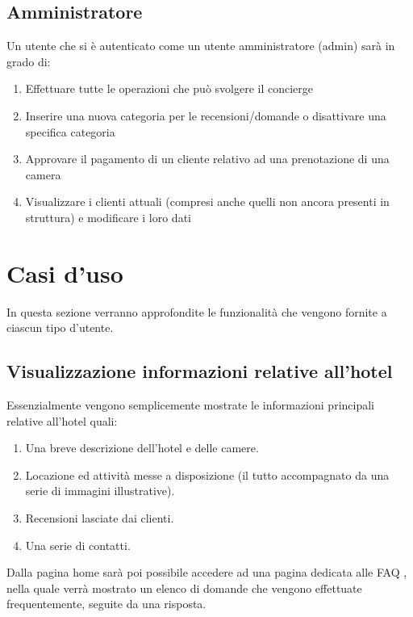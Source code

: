 \documentclass [a4paper, 12pt]{book}
\begin{document}
\subsection{Amministratore}
Un utente che si è autenticato come un utente amministratore (admin) sarà in grado di:
\begin{enumerate}
\item Effettuare tutte le operazioni che può svolgere il concierge
\item Inserire una nuova categoria per le recensioni/domande o disattivare una specifica categoria
\item Approvare il pagamento di un cliente relativo ad una prenotazione di una camera
\item Visualizzare i clienti attuali (compresi anche quelli non ancora presenti in struttura) e modificare i loro dati
\end{enumerate}

\medskip
\medskip

\section{Casi d'uso}
In questa sezione verranno approfondite le funzionalità che vengono fornite a ciascun tipo d'utente.

\subsection{Visualizzazione informazioni relative all'hotel}
Essenzialmente vengono semplicemente mostrate le informazioni principali relative all'hotel quali: 
\begin{enumerate}
\item Una breve descrizione dell'hotel e delle camere.
\item Locazione ed attività messe a disposizione (il tutto accompagnato da una serie di immagini illustrative).
\item Recensioni lasciate dai clienti.
\item Una serie di contatti.
\end{enumerate}
Dalla pagina home sarà poi possibile accedere ad una pagina dedicata alle FAQ , nella quale verrà mostrato un elenco di domande che vengono effettuate frequentemente, seguite da una risposta.

\medskip
\end{document}
